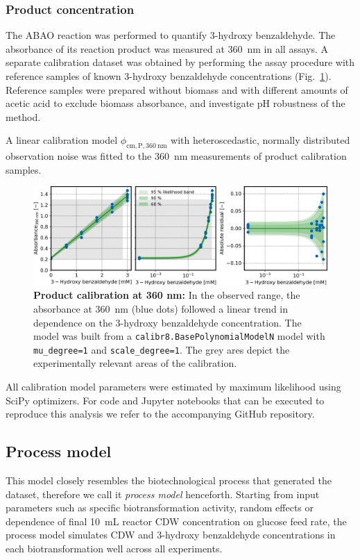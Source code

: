 \documentclass[sn-standardnature]{sn-jnl}%
\theoremstyle{thmstyleone}%
\theoremstyle{thmstyletwo}%
\theoremstyle{thmstylethree}%
\begin{document}
\subsubsection{Product concentration}
The ABAO reaction was performed to quantify 3-hydroxy benzaldehyde.
The absorbance of its reaction product was measured at 360~nm in all assays.
A separate calibration dataset was obtained by performing the assay procedure with reference samples of known 3-hydroxy benzaldehyde concentrations (Fig.~\ref{fig_cmPA360}).
Reference samples were prepared without biomass and with different amounts of acetic acid to exclude biomass absorbance, and investigate pH robustness of the method.

A linear calibration model $\phi_\mathrm{cm,P,360\ nm}$ with heteroscedastic, normally distributed observation noise was fitted to the 360~nm measurements of product calibration samples.

\begin{figure}[h]
    \centering
    \includegraphics[width=1.0\textwidth]{figures/cm_product_A360.png}
    \caption{
        \textbf{Product calibration at 360 nm:}
        In the observed range, the absorbance at 360~nm (blue dots) followed a linear trend in dependence on the 3-hydroxy benzaldehyde concentration.
        The model was built from a \texttt{calibr8.BasePolynomialModelN} model with \texttt{mu\_degree=1} and \texttt{scale\_degree=1}. 
        The grey ares depict the experimentally relevant areas of the calibration.
    }
    \label{fig_cmPA360}
\end{figure}

All calibration model parameters were estimated by maximum likelihood using SciPy optimizers.
For code and Jupyter notebooks that can be executed to reproduce this analysis we refer to the accompanying GitHub repository.


\subsection{Process model}
This model closely resembles the biotechnological process that generated the dataset, therefore we call it \textit{process model} henceforth.
Starting from input parameters such as specific biotransformation activity, random effects or dependence of final 10~mL reactor CDW concentration on glucose feed rate, the process model simulates CDW and 3-hydroxy benzaldehyde concentrations in each biotransformation well across all experiments.
\end{document}
